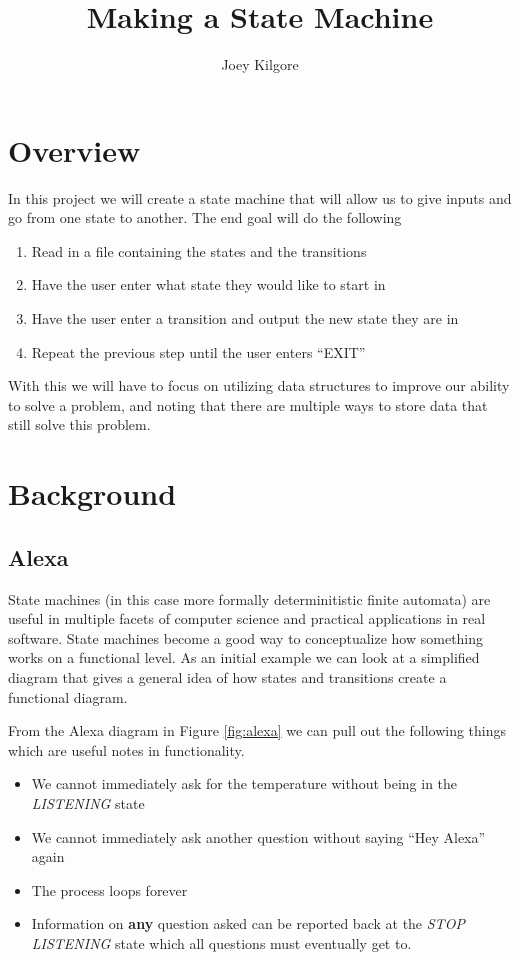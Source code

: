 \documentclass{article}
\title{Making a State Machine}
\author{Joey Kilgore}
\begin{document}
\maketitle

\section{Overview}
In this project we will create a state machine that will allow us to give inputs and go from one state to another. The end goal will do the following

\begin{enumerate}
\item Read in a file containing the states and the transitions
\item Have the user enter what state they would like to start in
\item Have the user enter a transition and output the new state they are in
\item Repeat the previous step until the user enters ``EXIT''
\end{enumerate}

With this we will have to focus on utilizing data structures to improve our ability to solve a problem, and noting that there are multiple ways to store data that still solve this problem.

\section{Background}
\subsection{Alexa}
State machines (in this case more formally determinitistic finite automata) are useful in multiple facets of computer science and practical applications in real software. State machines become a good way to conceptualize how something works on a functional level. As an initial example we can look at a simplified diagram that gives a general idea of how states and transitions create a functional diagram.

From the Alexa diagram in Figure \ref{fig:alexa} we can pull out the following things which are useful notes in functionality.

\begin{itemize}
\item We cannot immediately ask for the temperature without being in the \textit{LISTENING} state
\item We cannot immediately ask another question without saying ``Hey Alexa'' again
\item The process loops forever
\item Information on \textbf{any} question asked can be reported back at the \textit{STOP LISTENING} state which all questions must eventually get to.
\end{itemize}
\end{document}
